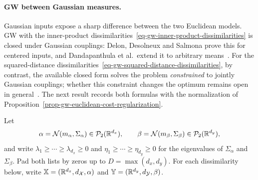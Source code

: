 \paragraph{GW between Gaussian measures.}
Gaussian inputs expose a sharp difference between the two Euclidean models. GW with the inner-product dissimilarities~\eqref{eq-gw-inner-product-dissimilarities} is closed under Gaussian couplings: Delon, Desolneux and Salmona prove this for centered inputs, and Dandapanthula et al.\ extend it to arbitrary means~\cite{SalmonaDelonDesolneux2022GaussianGW,DandapanthulaEtAl2025GaussianAlignment}. For the squared-distance dissimilarities~\eqref{eq-gw-squared-distance-dissimilarities}, by contrast, the available closed form solves the problem \emph{constrained} to jointly Gaussian couplings; whether this constraint changes the optimum remains open in general~\cite{SalmonaDelonDesolneux2022GaussianGW}. The next result records both formulas with the normalization of Proposition~\ref{prop-gw-euclidean-cost-regularization}.

Let
\[
	\alpha=\mathcal{N}(m_\alpha,\Sigma_\alpha)\in\mathcal{P}_2(\mathbb{R}^{d_x}),
	\qquad
	\beta=\mathcal{N}(m_\beta,\Sigma_\beta)\in\mathcal{P}_2(\mathbb{R}^{d_y}),
\]
and write $\lambda_1\geq\cdots\geq\lambda_{d_x}\geq0$ and $\eta_1\geq\cdots\geq\eta_{d_y}\geq0$ for the eigenvalues of $\Sigma_\alpha$ and $\Sigma_\beta$. Pad both lists by zeros up to $D=\max(d_x,d_y)$.
For each dissimilarity below, write $\mathbb{X}=(\mathbb{R}^{d_x},d_{\mathcal{X}},\alpha)$ and $\mathbb{Y}=(\mathbb{R}^{d_y},d_{\mathcal{Y}},\beta)$.

